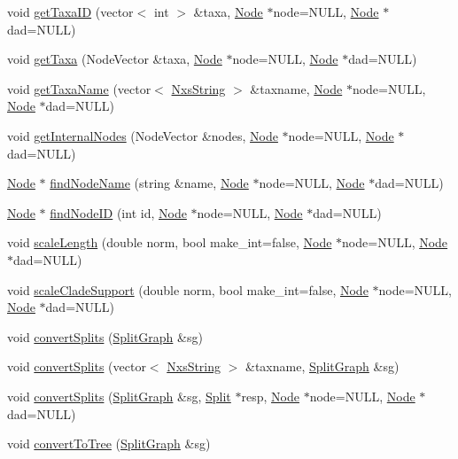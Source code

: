 \begin{DoxyCompactItemize}
\item 
void \hyperlink{classMTree_ab0f71f4d94294490f3afe53873d394b5}{getTaxaID} (vector$<$ int $>$ \&taxa, \hyperlink{classNode}{Node} $\ast$node=NULL, \hyperlink{classNode}{Node} $\ast$dad=NULL)
\item 
void \hyperlink{classMTree_af8a50c7ddd8edaf62e10c14e719c6b05}{getTaxa} (NodeVector \&taxa, \hyperlink{classNode}{Node} $\ast$node=NULL, \hyperlink{classNode}{Node} $\ast$dad=NULL)
\item 
void \hyperlink{classMTree_a7552f9cfb570e529ba25a4d6f223ea16}{getTaxaName} (vector$<$ \hyperlink{classNxsString}{NxsString} $>$ \&taxname, \hyperlink{classNode}{Node} $\ast$node=NULL, \hyperlink{classNode}{Node} $\ast$dad=NULL)
\item 
void \hyperlink{classMTree_a26dd819152fe104a747b279619c0e844}{getInternalNodes} (NodeVector \&nodes, \hyperlink{classNode}{Node} $\ast$node=NULL, \hyperlink{classNode}{Node} $\ast$dad=NULL)
\item 
\hyperlink{classNode}{Node} $\ast$ \hyperlink{classMTree_a9bccf760c31c8eb021c4c93eb40575ed}{findNodeName} (string \&name, \hyperlink{classNode}{Node} $\ast$node=NULL, \hyperlink{classNode}{Node} $\ast$dad=NULL)
\item 
\hyperlink{classNode}{Node} $\ast$ \hyperlink{classMTree_a391cb6c0dc914177caa89a42a5fb8dcc}{findNodeID} (int id, \hyperlink{classNode}{Node} $\ast$node=NULL, \hyperlink{classNode}{Node} $\ast$dad=NULL)
\item 
void \hyperlink{classMTree_a2f178b012e999e855bafa053a8caba8f}{scaleLength} (double norm, bool make\_\-int=false, \hyperlink{classNode}{Node} $\ast$node=NULL, \hyperlink{classNode}{Node} $\ast$dad=NULL)
\item 
void \hyperlink{classMTree_a3d183600999c6af85817be3959b43ca8}{scaleCladeSupport} (double norm, bool make\_\-int=false, \hyperlink{classNode}{Node} $\ast$node=NULL, \hyperlink{classNode}{Node} $\ast$dad=NULL)
\item 
void \hyperlink{classMTree_a95c626b2d8172ad06fabab353a77346e}{convertSplits} (\hyperlink{classSplitGraph}{SplitGraph} \&sg)
\item 
void \hyperlink{classMTree_a491979300fde5d4fac2f820c6ae327af}{convertSplits} (vector$<$ \hyperlink{classNxsString}{NxsString} $>$ \&taxname, \hyperlink{classSplitGraph}{SplitGraph} \&sg)
\item 
void \hyperlink{classMTree_a4f9af679d8d53b11044343f6a394e9ab}{convertSplits} (\hyperlink{classSplitGraph}{SplitGraph} \&sg, \hyperlink{classSplit}{Split} $\ast$resp, \hyperlink{classNode}{Node} $\ast$node=NULL, \hyperlink{classNode}{Node} $\ast$dad=NULL)
\item 
void \hyperlink{classMTree_abd4b8cde5e2244eac599a42b33f21698}{convertToTree} (\hyperlink{classSplitGraph}{SplitGraph} \&sg)
\end{DoxyCompactItemize}
